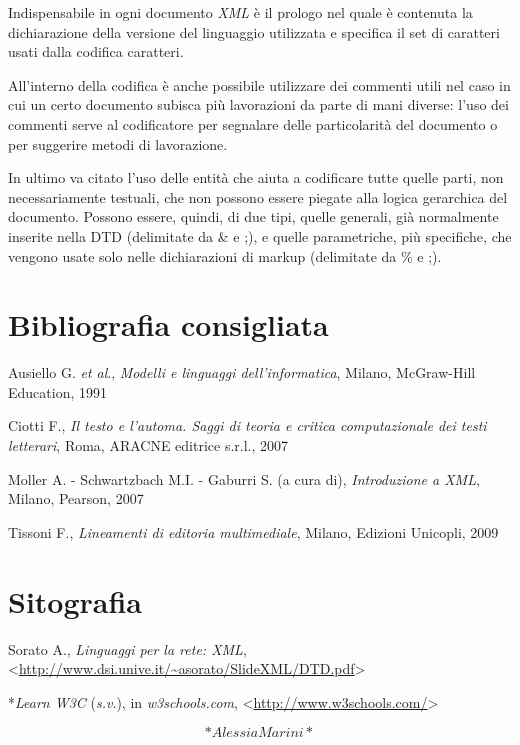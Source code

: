 \documentclass[
  b5paper,
  twoside,
  11pt,
  chapterprefix=false,
  bibliography=totocnumbered,
  parskip=0]{scrbook}
\begin{document}
Indispensabile in ogni documento \emph{XML} è il prologo nel quale è
contenuta la dichiarazione della versione del linguaggio utilizzata e
specifica il set di caratteri usati dalla codifica caratteri.

All'interno della codifica è anche possibile utilizzare dei commenti
utili nel caso in cui un certo documento subisca più lavorazioni da
parte di mani diverse: l'uso dei commenti serve al codificatore per
segnalare delle particolarità del documento o per suggerire metodi di
lavorazione.

In ultimo va citato l'uso delle entità che aiuta a codificare tutte
quelle parti, non necessariamente testuali, che non possono essere
piegate alla logica gerarchica del documento. Possono essere, quindi, di
due tipi, quelle generali, già normalmente inserite nella DTD
(delimitate da \& e ;), e quelle parametriche, più specifiche, che
vengono usate solo nelle dichiarazioni di markup (delimitate da \% e ;).

\hypertarget{bibliografia-consigliata-28}{%
\section*{Bibliografia consigliata}\label{bibliografia-consigliata-28}}

Ausiello G. \emph{et al}., \emph{Modelli e linguaggi dell'informatica}, Milano,
McGraw-Hill Education, 1991

Ciotti F., \emph{Il testo e l'automa. Saggi di teoria e critica
computazionale dei testi letterari}, Roma, ARACNE editrice s.r.l., 2007

Moller A. - Schwartzbach M.I. - Gaburri S. (a cura di), \emph{Introduzione a
XML}, Milano, Pearson, 2007

Tissoni F., \emph{Lineamenti di editoria multimediale}, Milano, Edizioni
Unicopli, 2009

\hypertarget{sitografia-35}{%
\section*{Sitografia}\label{sitografia-35}}

Sorato A., \emph{Linguaggi per la rete: XML},
\textless{}{\url{http://www.dsi.unive.it/~asorato/SlideXML/DTD.pdf}\textgreater{}}

*\emph{Learn W3C} (\emph{s.v}.), in \emph{w3schools.com},
\textless{}{\url{http://www.w3schools.com/}\textgreater{}}

\[*Alessia Marini*\]

\backmatter
\end{document}
